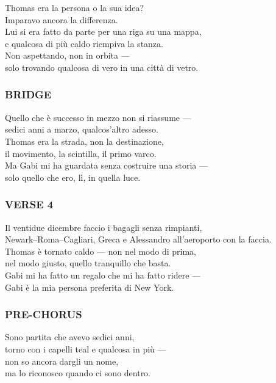 Thomas era la persona o la sua idea?\\
Imparavo ancora la differenza.\\
Lui si era fatto da parte per una riga su una mappa,\\
e qualcosa di più caldo riempiva la stanza.\\
Non aspettando, non in orbita ---\\
solo trovando qualcosa di vero in una città di vetro.

\subsubsection{BRIDGE}\label{bridge-11}

Quello che è successo in mezzo non si riassume ---\\
sedici anni a marzo, qualcos'altro adesso.\\
Thomas era la strada, non la destinazione,\\
il movimento, la scintilla, il primo varco.\\
Ma Gabi mi ha guardata senza costruire una storia ---\\
solo quello che ero, lì, in quella luce.

\subsubsection{VERSE 4}\label{verse-4-7}

Il ventidue dicembre faccio i bagagli senza rimpianti,\\
Newark--Roma--Cagliari, Greca e Alessandro all'aeroporto con la
faccia.\\
Thomas è tornato caldo --- non nel modo di prima,\\
nel modo giusto, quello tranquillo che basta.\\
Gabi mi ha fatto un regalo che mi ha fatto ridere ---\\
Gabi è la mia persona preferita di New York.

\subsubsection{PRE-CHORUS}\label{pre-chorus-28}

Sono partita che avevo sedici anni,\\
torno con i capelli teal e qualcosa in più ---\\
non so ancora dargli un nome,\\
ma lo riconosco quando ci sono dentro.

